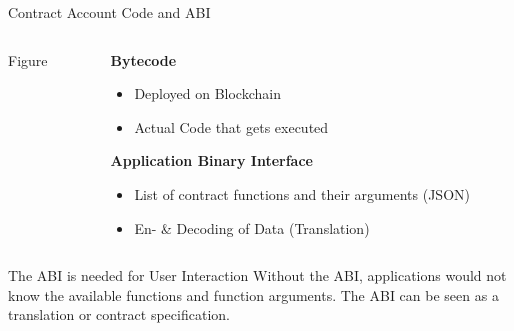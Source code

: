 \documentclass[handout]{beamer}
\begin{document}
\begin{frame}{Contract Account Code and ABI}
	\begin{columns}[T]
		\begin{column}{0.4\textwidth}
			Figure
		\end{column}
		\begin{column}{0.6\textwidth}
			\textbf{Bytecode}
				\begin{itemize}
					\item Deployed on Blockchain
					\item Actual Code that gets executed
				\end{itemize}
		\vspace{2em}
			\textbf{Application Binary Interface}
				\begin{itemize}
					\item List of contract functions and their arguments (JSON)
					\item En- \& Decoding of Data (Translation) 
				\end{itemize}
		\end{column}
	\end{columns}
\vspace{1em}
	\begin{keytakeaway}{The ABI is needed for User Interaction}
		 Without the ABI, applications would not know the available functions and function arguments. The ABI can be seen as a translation or contract specification.
	\end{keytakeaway}		
\end{frame}
\end{document}
